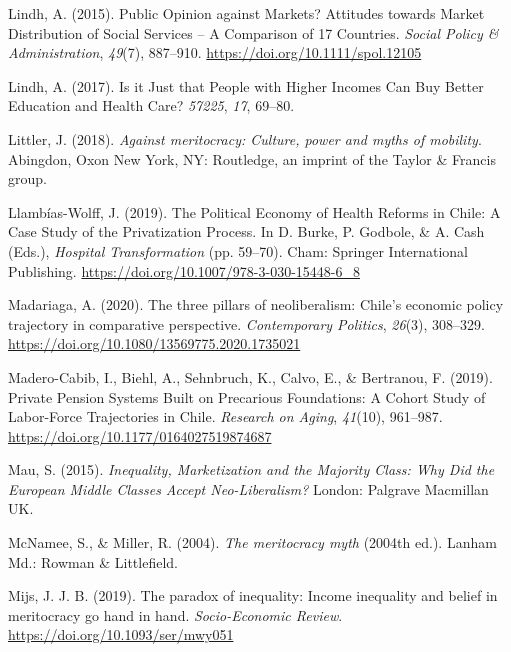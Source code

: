 \documentclass[
  12pt,
]{article}
\newlength{\cslhangindent}
\newenvironment{CSLReferences}[2] %
 {\begin{list}{}{%
  \setlength{\itemindent}{0pt}
  \setlength{\leftmargin}{0pt}
  \setlength{\parsep}{0pt}
  \ifodd #1
   \setlength{\leftmargin}{\cslhangindent}
   \setlength{\itemindent}{-1\cslhangindent}
  \fi
  \setlength{\itemsep}{#2\baselineskip}}}
 {\end{list}}
\begin{document}
\begin{CSLReferences}{1}{0}
Lindh, A. (2015). Public {Opinion} against {Markets}? {Attitudes}
towards {Market Distribution} of {Social Services} -- {A Comparison} of
17 {Countries}. \emph{Social Policy \& Administration}, \emph{49}(7),
887--910. \url{https://doi.org/10.1111/spol.12105}

Lindh, A. (2017). Is it {Just} that {People} with {Higher Incomes Can
Buy Better Education} and {Health Care}? \emph{57225}, \emph{17},
69--80.

Littler, J. (2018). \emph{Against meritocracy: Culture, power and myths
of mobility}. Abingdon, Oxon New York, NY: Routledge, an imprint of the
Taylor \& Francis group.

Llambías-Wolff, J. (2019). The {Political Economy} of {Health Reforms}
in {Chile}: {A Case Study} of the {Privatization Process}. In D. Burke,
P. Godbole, \& A. Cash (Eds.), \emph{Hospital {Transformation}} (pp.
59--70). Cham: Springer International Publishing.
\url{https://doi.org/10.1007/978-3-030-15448-6_8}

Madariaga, A. (2020). The three pillars of neoliberalism: {Chile}'s
economic policy trajectory in comparative perspective.
\emph{Contemporary Politics}, \emph{26}(3), 308--329.
\url{https://doi.org/10.1080/13569775.2020.1735021}

Madero-Cabib, I., Biehl, A., Sehnbruch, K., Calvo, E., \& Bertranou, F.
(2019). Private {Pension Systems Built} on {Precarious Foundations}: {A
Cohort Study} of {Labor-Force Trajectories} in {Chile}. \emph{Research
on Aging}, \emph{41}(10), 961--987.
\url{https://doi.org/10.1177/0164027519874687}

Mau, S. (2015). \emph{Inequality, {Marketization} and the {Majority
Class}: {Why Did} the {European Middle Classes Accept Neo-Liberalism}?}
London: Palgrave Macmillan UK.

McNamee, S., \& Miller, R. (2004). \emph{The meritocracy myth} (2004th
ed.). Lanham Md.: Rowman \& Littlefield.

Mijs, J. J. B. (2019). The paradox of inequality: Income inequality and
belief in meritocracy go hand in hand. \emph{Socio-Economic Review}.
\url{https://doi.org/10.1093/ser/mwy051}


\end{CSLReferences}
\end{document}
